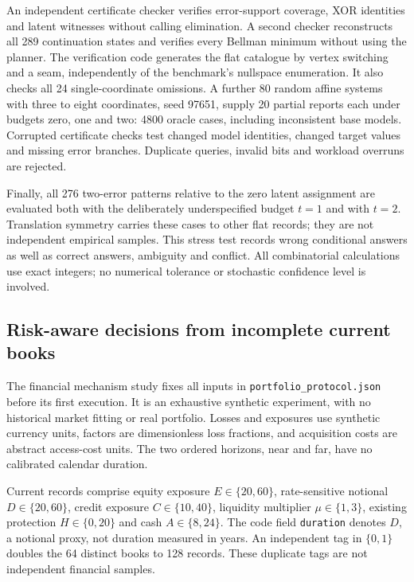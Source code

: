 \documentclass[11pt,a4paper]{article}
\theoremstyle{definition}\newtheorem{definition}[theorem]{Definition}
\begin{document}
An independent certificate checker verifies error-support coverage, XOR identities and latent witnesses without calling elimination. A second checker reconstructs all 289 continuation states and verifies every Bellman minimum without using the planner. The verification code generates the flat catalogue by vertex switching and a seam, independently of the benchmark's nullspace enumeration. It also checks all 24 single-coordinate omissions. A further 80 random affine systems with three to eight coordinates, seed 97651, supply 20 partial reports each under budgets zero, one and two: 4800 oracle cases, including inconsistent base models. Corrupted certificate checks test changed model identities, changed target values and missing error branches. Duplicate queries, invalid bits and workload overruns are rejected.

Finally, all 276 two-error patterns relative to the zero latent assignment are evaluated both with the deliberately underspecified budget $t=1$ and with $t=2$. Translation symmetry carries these cases to other flat records; they are not independent empirical samples. This stress test records wrong conditional answers as well as correct answers, ambiguity and conflict. All combinatorial calculations use exact integers; no numerical tolerance or stochastic confidence level is involved.

\subsection{Risk-aware decisions from incomplete current books}\label{sec:portfolioprotocol}
The financial mechanism study fixes all inputs in \texttt{portfolio\_protocol.json} before its first execution. It is an exhaustive synthetic experiment, with no historical market fitting or real portfolio. Losses and exposures use synthetic currency units, factors are dimensionless loss fractions, and acquisition costs are abstract access-cost units. The two ordered horizons, near and far, have no calibrated calendar duration.

Current records comprise equity exposure $E\in\{20,60\}$, rate-sensitive notional $D\in\{20,60\}$, credit exposure $C\in\{10,40\}$, liquidity multiplier $\mu\in\{1,3\}$, existing protection $H\in\{0,20\}$ and cash $A\in\{8,24\}$. The code field \texttt{duration} denotes $D$, a notional proxy, not duration measured in years. An independent tag in $\{0,1\}$ doubles the 64 distinct books to 128 records. These duplicate tags are not independent financial samples.
\end{document}
